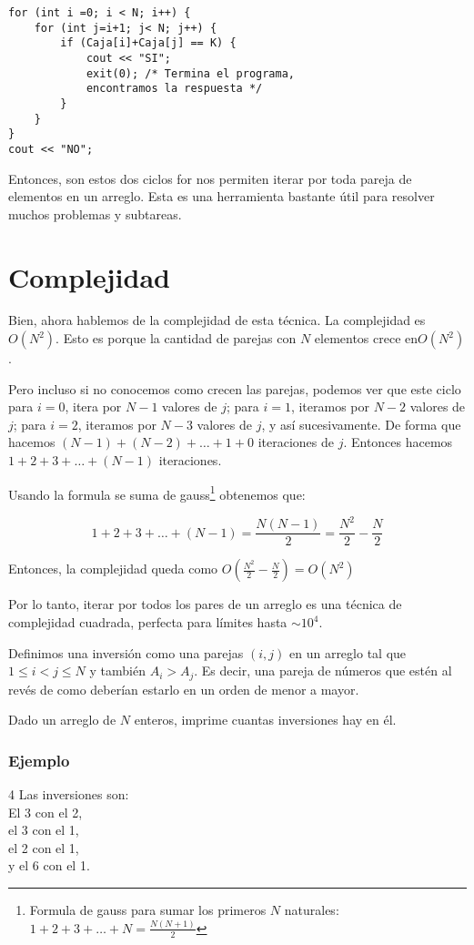 \begin{lstlisting}
for (int i =0; i < N; i++) {
	for (int j=i+1; j< N; j++) {
		if (Caja[i]+Caja[j] == K) {
			cout << "SI";
			exit(0); /* Termina el programa, 
			encontramos la respuesta */
		}
	}
}
cout << "NO";
\end{lstlisting}

Entonces, son estos dos ciclos for nos permiten iterar por toda pareja de elementos en un arreglo. Esta es una herramienta bastante útil para resolver muchos problemas y subtareas.

\section * {Complejidad}
Bien, ahora hablemos de la complejidad de esta técnica. La complejidad es \(O(N^2)\). Esto es porque la cantidad de parejas con \(N\) elementos crece en\(O(N^2)\).

Pero incluso si no conocemos como crecen las parejas, podemos ver que este ciclo para \(i = 0\), itera por \(N-1\) valores de \(j\); para \(i=1\), iteramos por \(N-2\) valores de \(j\); para \(i=2\), iteramos por \(N-3\) valores de \(j\), y así sucesivamente. De forma que hacemos \((N-1)+(N-2)+\ldots+1+0\) iteraciones de \(j\). Entonces hacemos \(1+2+3+\ldots+(N-1)\) iteraciones.

Usando la formula se suma de gauss\footnote{Formula de gauss para sumar los primeros \(N\) naturales: \(1+2+3+\ldots+N=\frac{N(N+1)}{2}\)} obtenemos que:

\[1+2+3+\ldots+(N-1)=\frac{N(N-1)}{2}=\frac{N^2}{2}-\frac{N}{2}\]

Entonces, la complejidad queda como \(O(\frac{N^2}{2}-\frac{N}{2})=O(N^2)\)

Por lo tanto, iterar por todos los pares de un arreglo es una técnica de complejidad cuadrada, perfecta para límites hasta \(\sim{10^4}\).

\newpage


\problemtitle Definimos una inversión como una parejas \((i,j)\) en un arreglo tal que \(1\leq i < j \leq N\) y también \(A_i > A_j\). Es decir, una pareja de números que estén al revés de como deberían estarlo en un orden de menor a mayor.

Dado un arreglo de \(N\) enteros, imprime cuantas inversiones hay en él.

\subsubsection*{Ejemplo}
\begin{casebox3}
	{4}
	{
		Las inversiones son: \\
		El 3 con el 2, \\
		el 3 con el 1,\\
		el 2 con el 1, \\
		y el 6 con el 1. 
	}	
\end{casebox3}
